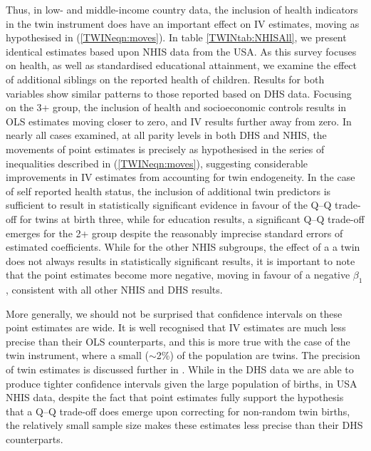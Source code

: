 \documentclass[subeqn]{article}
\begin{document}
\begin{spacing}{1.4}
Thus, in low- and middle-income country data, the inclusion of health 
indicators in the twin instrument does have an important effect on IV 
estimates, moving as hypothesised in (\ref{TWINeqn:moves}).  In table 
\ref{TWINtab:NHISAll}, we present identical estimates based upon NHIS data from
the USA. As this survey focuses on health, as well as standardised educational 
attainment, we examine the effect of additional siblings on the reported health
of children. Results for both variables show similar patterns to those reported 
based on DHS data.  Focusing on the 3+ group, the inclusion of health and 
socioeconomic controls results in OLS estimates moving closer to zero, and IV 
results further away from zero. In nearly all cases examined, at all parity 
levels in both DHS and NHIS, the movements of point estimates is precisely as
 hypothesised in the series of inequalities described in (\ref{TWINeqn:moves}), 
suggesting considerable improvements in IV estimates from accounting for twin
endogeneity.  In the case of self reported health status, the inclusion of 
additional twin predictors is sufficient to result in statistically significant 
evidence in favour of the Q--Q trade-off for twins at birth three, while for
education results, a significant Q--Q trade-off emerges for the 2+ group despite 
the reasonably imprecise standard errors of estimated coefficients. While for 
the other NHIS subgroups, the effect of a a twin does not always results in
statistically significant results, it is important to note that the point 
estimates become more negative, moving in favour of a negative $\beta_1$, 
consistent with all other NHIS and DHS results.

More generally, we should not be surprised that confidence intervals on these
point estimates are wide.  It is well recognised that IV estimates are much
less precise than their OLS counterparts, and this is more true with the case
of the twin instrument, where a small ($\sim$2\%) of the population are twins.
The precision of twin estimates is discussed further in \citet{Angristetal2010}.
While in the DHS data we are able to produce tighter confidence intervals given
the large population of births, in USA NHIS data, despite the fact that point 
estimates fully support the hypothesis that a Q--Q trade-off does emerge upon 
correcting for non-random twin births, the relatively small sample size makes 
these estimates less precise than their DHS counterparts.



\end{spacing}
\end{document}
